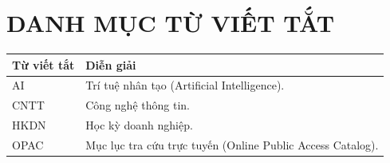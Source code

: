 \documentclass[12pt,a4paper,oneside]{report}
\begin{document}
\chapter*{DANH MỤC TỪ VIẾT TẮT}
\begin{tabularx}{\textwidth}{@{}P{2.2cm}Y@{}}
\toprule
\textbf{Từ viết tắt} & \textbf{Diễn giải}\\
\midrule
AI & Trí tuệ nhân tạo (Artificial Intelligence).\\
CNTT & Công nghệ thông tin.\\
HKDN & Học kỳ doanh nghiệp.\\
OPAC & Mục lục tra cứu trực tuyến (Online Public Access Catalog).\\
\bottomrule
\end{tabularx}
\clearpage
{}

\clearpage
{}
{}

\end{document}
